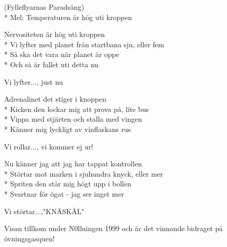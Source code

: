 \begin{SongText}
    \begin{SongInfo}
        (Fylleflyarnas Paradsång)\\*%
        Mel: Temperaturen är hög uti kroppen
    \end{SongInfo}
    \begin{SongVerse}
        Nervositeten är hög uti kroppen\\*%
        Vi lyfter med planet från startbana sju, eller fem\\*%
        Så ska det vara när planet är oppe\\*%
        Och så är fallet uti detta nu
    \end{SongVerse}
    \begin{SongVerse}
        Vi lyfter..., just nu
    \end{SongVerse}
    \begin{SongVerse}
        Adrenalinet det stiger i knoppen\\*%
        Kicken den lockar mig att prova på, lite bus\\*%
        Vippa med stjärten och stalla med vingen\\*%
        Känner mig lyckligt av vinflaskans rus
    \end{SongVerse}
    \begin{SongVerse}
        Vi rollar..., vi kommer ej ur!
    \end{SongVerse}
    \begin{SongVerse}
        Nu känner jag att jag har tappat kontrollen\\*%
        Störtar mot marken i sjuhundra knyck, eller mer\\*%
        Spriten den står mig högt upp i bollen\\*%
        Svartnar för ögat - jag ser inget mer
    \end{SongVerse}
    \begin{SongVerse}
        Vi störtar...,"KNÄSKÅL"
    \end{SongVerse}
    \begin{SongInfo}
        Visan tillkom under N0llningen 1999 och är det vinnande bidraget på övningsgasquen!
    \end{SongInfo}
\end{SongText}
